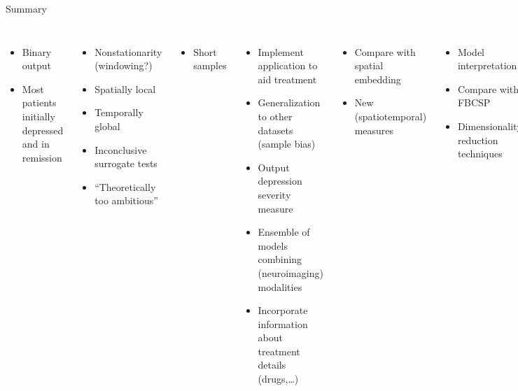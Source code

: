 \documentclass{beamer}
\begin{document}
\begin{frame}[t]{Summary}
  \centering
  \begin{columns}[t]
    \begin{itemize}
      \item Binary output
      \item Most patients initially depressed and in remission %
    \end{itemize}
        \begin{itemize}
          \item Nonstationarity {\scriptsize (windowing?)} 
          \item Spatially local %
          \item Temporally global
          \item Inconclusive surrogate tests
          \item ``Theoretically too ambitious''
        \end{itemize}
        \begin{itemize}
          \item Short samples
        \end{itemize}

    \scriptsize
    \begin{itemize}
      \item Implement application to aid treatment
      \item Generalization to other datasets {\scriptsize (sample bias) }
      \item Output depression severity measure
      \item Ensemble of models combining (neuroimaging) modalities
      \item Incorporate information about treatment details (drugs,\ldots)
    \end{itemize}
        \begin{itemize}
          \item Compare with spatial embedding
          \item New (spatiotemporal) measures
        \end{itemize}
        \begin{itemize}
          \item Model interpretation %
          \item Compare with FBCSP
          \item Dimensionality reduction techniques
        \end{itemize}
  \end{columns}
\end{frame}
\appendix
\end{document}

